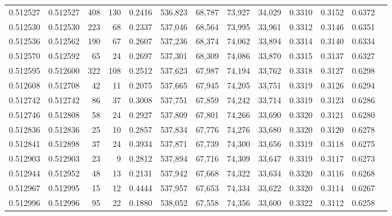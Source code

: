 \begin{tabular}{rrrrrrrrrrrrr}
0.512527 & 0.512527 &   408 &   130 &                                     0.2416 & 536,823 &  68,787 &  73,927 &  34,029 & 0.3310 & 0.3152 & 0.6372 \\
0.512530 & 0.512530 &   223 &    68 &                                     0.2337 & 537,046 &  68,564 &  73,995 &  33,961 & 0.3312 & 0.3146 & 0.6351 \\
0.512536 & 0.512562 &   190 &    67 &                                     0.2607 & 537,236 &  68,374 &  74,062 &  33,894 & 0.3314 & 0.3140 & 0.6334 \\
0.512570 & 0.512592 &    65 &    24 &                                     0.2697 & 537,301 &  68,309 &  74,086 &  33,870 & 0.3315 & 0.3137 & 0.6327 \\
0.512595 & 0.512600 &   322 &   108 &                                     0.2512 & 537,623 &  67,987 &  74,194 &  33,762 & 0.3318 & 0.3127 & 0.6298 \\
0.512608 & 0.512708 &    42 &    11 &                                     0.2075 & 537,665 &  67,945 &  74,205 &  33,751 & 0.3319 & 0.3126 & 0.6294 \\
0.512742 & 0.512742 &    86 &    37 &                                     0.3008 & 537,751 &  67,859 &  74,242 &  33,714 & 0.3319 & 0.3123 & 0.6286 \\
0.512746 & 0.512808 &    58 &    24 &                                     0.2927 & 537,809 &  67,801 &  74,266 &  33,690 & 0.3320 & 0.3121 & 0.6280 \\
0.512836 & 0.512836 &    25 &    10 &                                     0.2857 & 537,834 &  67,776 &  74,276 &  33,680 & 0.3320 & 0.3120 & 0.6278 \\
0.512841 & 0.512898 &    37 &    24 &                                     0.3934 & 537,871 &  67,739 &  74,300 &  33,656 & 0.3319 & 0.3118 & 0.6275 \\
0.512903 & 0.512903 &    23 &     9 &                                     0.2812 & 537,894 &  67,716 &  74,309 &  33,647 & 0.3319 & 0.3117 & 0.6273 \\
0.512944 & 0.512952 &    48 &    13 &                                     0.2131 & 537,942 &  67,668 &  74,322 &  33,634 & 0.3320 & 0.3116 & 0.6268 \\
0.512967 & 0.512995 &    15 &    12 &                                     0.4444 & 537,957 &  67,653 &  74,334 &  33,622 & 0.3320 & 0.3114 & 0.6267 \\
0.512996 & 0.512996 &    95 &    22 &                                     0.1880 & 538,052 &  67,558 &  74,356 &  33,600 & 0.3322 & 0.3112 & 0.6258 \\

\end{tabular}
